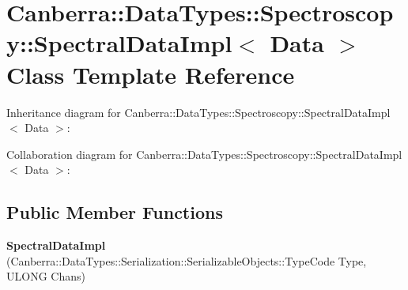 \hypertarget{class_canberra_1_1_data_types_1_1_spectroscopy_1_1_spectral_data_impl}{}\section{Canberra\+:\+:Data\+Types\+:\+:Spectroscopy\+:\+:Spectral\+Data\+Impl$<$ Data $>$ Class Template Reference}
\label{class_canberra_1_1_data_types_1_1_spectroscopy_1_1_spectral_data_impl}


Inheritance diagram for Canberra\+:\+:Data\+Types\+:\+:Spectroscopy\+:\+:Spectral\+Data\+Impl$<$ Data $>$\+:


Collaboration diagram for Canberra\+:\+:Data\+Types\+:\+:Spectroscopy\+:\+:Spectral\+Data\+Impl$<$ Data $>$\+:
\subsection*{Public Member Functions}
\begin{DoxyCompactItemize}
\item 
\mbox{\label{class_canberra_1_1_data_types_1_1_spectroscopy_1_1_spectral_data_impl_a283cd1fc10a4a28b97132832853d54cd}} 
{\bfseries Spectral\+Data\+Impl} (Canberra\+::\+Data\+Types\+::\+Serialization\+::\+Serializable\+Objects\+::\+Type\+Code Type, U\+L\+O\+NG Chans)
\end{DoxyCompactItemize}
